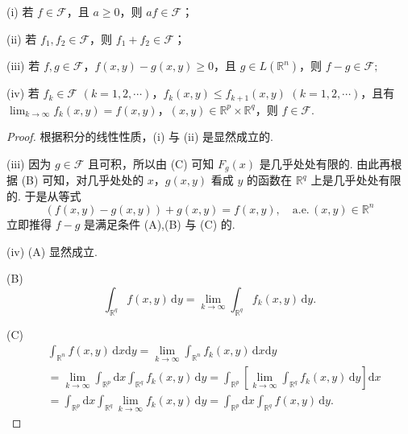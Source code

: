 \documentclass[../../main.tex]{subfiles}%
\begin{document}
\begin{lemma}\label{lemma:引理4.28}
(i) 若 \( f \in \mathcal{F} \)，且 \( a \geqslant  0 \)，则 \( af \in \mathcal{F} \)；

(ii) 若 \( f_1, f_2 \in \mathcal{F} \)，则 \( f_1 + f_2 \in \mathcal{F} \)；

(iii) 若 \( f, g \in \mathcal{F} \)，\( f(x, y) - g(x, y) \geqslant  0 \)，且 \( g \in L(\mathbb{R}^n) \)，则
\(
f - g \in \mathcal{F};
\)

(iv) 若 \( f_k \in \mathcal{F} \) \( (k = 1, 2, \cdots) \)，\( f_k(x, y) \leqslant  f_{k + 1}(x, y) \) \( (k = 1, 2, \cdots) \)，且有 \( \lim_{k \to \infty} f_k(x, y) = f(x, y) \)，\( (x, y) \in \mathbb{R}^p \times \mathbb{R}^q \)，则 \( f \in \mathcal{F} \).
\end{lemma}
\begin{proof}

根据积分的线性性质，(i) 与 (ii) 是显然成立的.

(iii) 因为 \( g \in \mathcal{F} \) 且可积，所以由 (C) 可知 \( F_g(x) \) 是几乎处处有限的. 由此再根据 (B) 可知，对几乎处处的 \( x \)，\( g(x, y) \) 看成 \( y \) 的函数在 \( \mathbb{R}^q \) 上是几乎处处有限的. 于是从等式
\[
(f(x, y) - g(x, y)) + g(x, y) = f(x, y), \quad \text{a.e.}\, (x, y) \in \mathbb{R}^n
\]
立即推得 \( f - g \) 是满足条件 (A),(B) 与 (C) 的.

(iv) (A) 显然成立.

(B)
\[
\int_{\mathbb{R}^q} f(x, y) \, \mathrm{d}y = \lim_{k \to \infty} \int_{\mathbb{R}^q} f_k(x, y) \, \mathrm{d}y.
\]

(C)
\begin{align*}
&\int_{\mathbb{R}^n} f(x, y) \, \mathrm{d}x\mathrm{d}y = \lim_{k \to \infty} \int_{\mathbb{R}^n} f_k(x, y) \, \mathrm{d}x\mathrm{d}y \\
&= \lim_{k \to \infty} \int_{\mathbb{R}^p} \mathrm{d}x \int_{\mathbb{R}^q} f_k(x, y) \, \mathrm{d}y = \int_{\mathbb{R}^p} \left[ \lim_{k \to \infty} \int_{\mathbb{R}^q} f_k(x, y) \, \mathrm{d}y \right] \mathrm{d}x \\
&= \int_{\mathbb{R}^p} \mathrm{d}x \int_{\mathbb{R}^q} \lim_{k \to \infty} f_k(x, y) \, \mathrm{d}y = \int_{\mathbb{R}^p} \mathrm{d}x \int_{\mathbb{R}^q} f(x, y) \, \mathrm{d}y.
\end{align*}

\end{proof}
\end{document}
